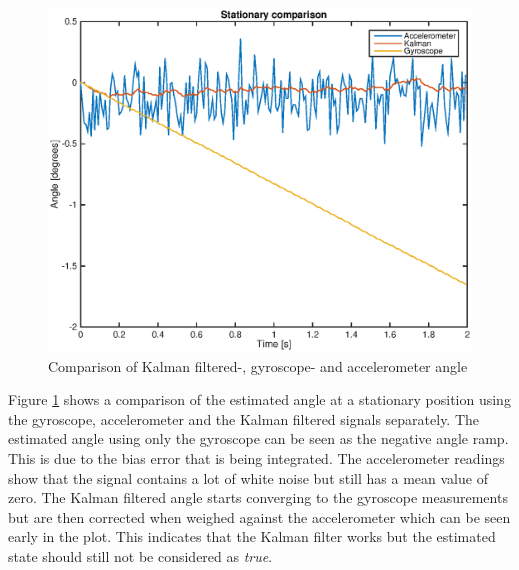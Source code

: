 \documentclass[a4paper,11pt]{kth-mag}
\begin{document}
\begin{figure}[!htb]
\centering
\includegraphics[scale=0.6]{Stationarycomparison.eps}
\caption{Comparison of Kalman filtered-, gyroscope- and accelerometer angle}
\label{Fig: Kalman comparison}
\end{figure}
Figure \ref{Fig: Kalman comparison} shows a comparison of the estimated angle at a stationary position using the gyroscope, accelerometer and the Kalman filtered signals separately. The estimated angle using only the gyroscope can be seen as the negative angle ramp. This is due to the bias error that is being integrated. The accelerometer readings show that the signal contains a lot of white noise but still has a mean value of zero. 
The Kalman filtered angle starts converging to the gyroscope measurements but are then corrected when weighed against the accelerometer which can be seen early in the plot. 
This indicates that the Kalman filter works but the estimated state should still not be considered as \textit{true}. 
\end{document}
